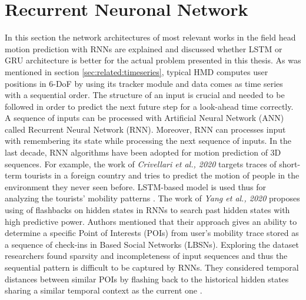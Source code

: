 \section{Recurrent Neuronal Network}
\label{sec:related:deep}
In this section the network architectures of most relevant works in the field head motion prediction with RNNs are explained and discussed whether LSTM or GRU architecture is better for the actual problem presented in this thesis. As was mentioned in section \ref{sec:related:timeseries}, typical HMD computes user positions in 6-DoF by using its tracker module and data comes as time series with a sequential order. The structure of an input is crucial and needed to be followed in order to predict the next future step for a look-ahead time correctly. A sequence of inputs can be processed with Artificial Neural Network (ANN) called Recurrent Neural Network (RNN). Moreover, RNN can processes input with remembering its state while processing the next sequence of inputs. In the last decade, RNN algorithms have been adopted for motion prediction of 3D sequences. For example, the work of \textit{Crivellari et al., 2020} targets traces of short-term tourists in a foreign country and tries to predict the motion of people in the environment they never seen before. LSTM-based model is used thus for analyzing the tourists’ mobility patterns \cite{tourist_traces}. The work of \textit{Yang et al., 2020} proposes using of flashbacks on hidden states in RNNs to search past hidden states with high predictive power. Authors mentioned that their approach gives an ability to determine a specific Point of Interests (POIs) from user’s mobility trace stored as a sequence of check-ins in Based Social Networks (LBSNs). Exploring the dataset researchers found sparsity and incompleteness of input sequences and thus the sequential pattern is difficult to be captured by RNNs. They considered temporal distances between similar POIs by flashing back to the historical hidden states sharing a similar temporal context as the current one \cite{rnn_traces_hidden}. \\
